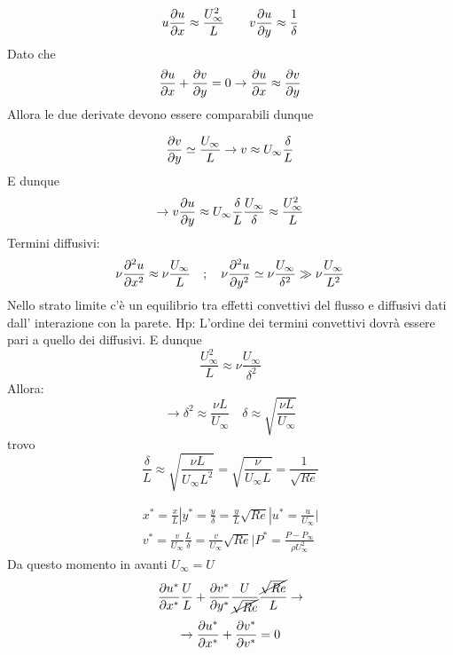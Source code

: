 \[
  u \frac{\partial u}{\partial x}\approx  \frac{U^2_\infty}{L}\qquad v\frac{\partial u}{\partial y}\approx \frac{1}{\delta }
\]
Dato che 
\[
  \frac{\partial u}{\partial x}+\frac{\partial v}{\partial y}= 0 \rightarrow \frac{\partial u}{\partial x}\approx \frac{\partial v}{\partial y}
\]
Allora le due derivate devono essere comparabili dunque

\[
  \frac{\partial v}{\partial y} \simeq \frac{U_\infty}{L} \rightarrow  v \approx U_\infty \frac{\delta}{L}
\]
E dunque
\[
  \rightarrow v \frac{\partial u}{\partial y}\approx U_\infty \frac{\delta}{L} \frac{U_\infty}{\delta } \approx \frac{U_\infty^2}{L}
\]
Termini diffusivi:
\[
  \nu \frac{\partial^2u}{\partial x^2}\approx \nu \frac{U_\infty}{L}\quad; \quad \nu \frac{\partial^2u}{\partial y^2}\simeq \nu \frac{U_\infty}{\delta ^2} \gg  \nu \frac{U_\infty}{L^2}
\]
Nello strato limite c'è un equilibrio tra effetti convettivi del flusso e diffusivi dati dall' interazione con la parete. Hp: L'ordine dei termini convettivi dovrà essere pari a quello dei diffusivi. E dunque
\[
  \frac{U_\infty^2}{L}\approx \nu \frac{U_\infty}{\delta ^2} 
\]
Allora: 
\[
  \rightarrow \delta ^2 \approx  \frac{\nu L}{U_\infty  } \quad \delta \approx \sqrt{\frac{{\nu L}}{U_\infty }}
\]
trovo
\[
  \frac{\delta}{L} \approx \sqrt{\frac{{\nu L}}{U_\infty L^2}} = \sqrt{\frac{{\nu}}{U_\infty L}} = \frac{1}{\sqrt{Re}}
\]
\hline
\vspace{1ex}
\[
\]

\begin{gather*}
  x^* = \frac{x}{L}| y^* = \frac{y}{\delta }=\frac{y}{L}\sqrt{Re}| u^* = \frac{u}{U_\infty }|\\
  v^* = \frac{v}{U_\infty }\frac{L}{\delta }=\frac{v}{U_\infty }\sqrt{Re}| P^*=\frac{{P-P_\infty }}{\rho U_\infty ^2}
\end{gather*}
Da questo momento in avanti $ U_\infty =U $
\[
  \frac{\partial u^*}{\partial x^*}\frac{U}{L}+ \frac{\partial v^*}{\partial y^*}\frac{U}{\cancel{\sqrt{Re}}}\frac{\cancel{\sqrt{Re}}}{L}\rightarrow 
\]
\[
  \rightarrow  \frac{\partial u^*}{\partial x^*}+ \frac{\partial v^*}{\partial v^*}=0
\]

